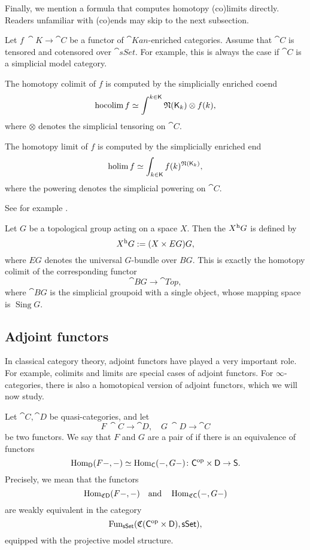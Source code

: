 Finally, we mention a formula that computes homotopy (co)limits directly.
Readers unfamiliar with (co)ends may skip to the next subsection.

\begin{proposition}
    Let $f\:\cat K\to\cat C$ be a functor of $\cat{Kan}$-enriched categories.
    Assume that $\cat C$ is tensored and cotensored over $\cat{sSet}$.
    For example, this is always the case if $\cat C$ is a simplicial model category.
    
    \begin{itms}
        \item The homotopy colimit of $f$
        is computed by the simplicially enriched coend 
        \[ \operatorname{hocolim}f\simeq\int^{k\in\mathsf{K}}\mathfrak{N}(\mathsf{K}_{k\/})\otimes f(k), \]
        where $\otimes$ denotes the simplicial tensoring on $\cat C$.
        \item The homotopy limit of $f$ is computed by the simplicially enriched end
        \[ \operatorname{holim}f\simeq\int_{k\in\mathsf{K}}f(k)^{\mathfrak{N}(\mathsf{K}_{\/k})}, \]
        where the powering denotes the simplicial powering on $\cat C$.
    \end{itms}
\end{proposition}

See for example \cite{riehl}.

\begin{example}
    Let $G$ be a topological group acting on a space $X$.
    Then the  $X\/{}^{\mathrm h}G$ is defined by 
    \[ X\/{}^{\mathrm h}G:=(X\times EG)\/G, \]
    where $EG$ denotes the universal $G$-bundle over $BG$.
    This is exactly the homotopy colimit of the corresponding functor 
    \[ \cat{B}G\to\cat{Top}, \]
    where $\cat BG$ is the simplicial groupoid with a single object,
    whose mapping space is $\operatorname{Sing}G$. \varqed
\end{example}

\subsection{Adjoint functors}

In classical category theory,
adjoint functors have played a very important role.
For example, colimits and limits are special cases of adjoint functors.
For $\infty$-categories,
there is also a homotopical version of adjoint functors,
which we will now study.

\begin{definition}
    Let $\cat C,\cat D$ be quasi-categories, and let 
    \[ F\:\cat C\to\cat D,\quad G\:\cat D\to\cat C \]    
    be two functors. We say that $F$ and $G$ are a pair of 
     if there is an equivalence of functors 
    \[ \operatorname{Hom}_{\mathsf{D}}(F-,-)\simeq\operatorname{Hom}_{\mathsf{C}}(-,G-)\colon\mathsf{C}^{\mathrm{op}}\times\mathsf{D}\to\mathsf{S}. \]
    Precisely, we mean that the functors
    \[ \operatorname{Hom}_{\mathfrak C\mathsf{D}}(F-,-)\quad\text{and}\quad\operatorname{Hom}_{\mathfrak C\mathsf{C}}(-,G-) \]
    are weakly equivalent in the category 
    \[ \operatorname{Fun}_{\mathsf{sSet}}(\mathfrak C(\mathsf{C}^{\mathrm{op}}\times\mathsf{D}),\mathsf{sSet}), \]
    equipped with the projective model structure.
\end{definition}

